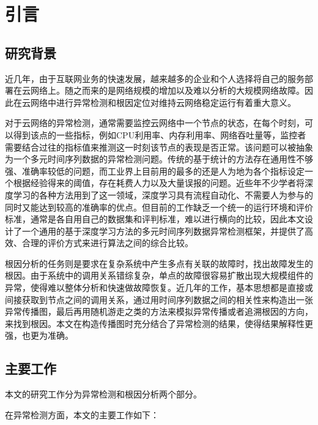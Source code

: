 
\chapter{引言}
\label{cha:intro}

\section{研究背景}
近几年，由于互联网业务的快速发展，越来越多的企业和个人选择将自己的服务部署在云网络上。随之而来的是网络规模的增加以及难以分析的大规模网络故障。因此在云网络中进行异常检测和根因定位对维持云网络稳定运行有着重大意义。

对于云网络的异常检测，通常需要监控云网络中一个节点的状态，在每个时刻，可以得到该点的一些指标，例如CPU利用率、内存利用率、网络吞吐量等，监控者需要结合过往的指标值来推测这一时刻该节点的表现是否正常。该问题可以被抽象为一个多元时间序列数据的异常检测问题。传统的基于统计的方法存在通用性不够强、准确率较低的问题，而工业界上目前用的最多的还是人为地为各个指标设定一个根据经验得来的阈值，存在耗费人力以及大量误报的问题。近些年不少学者\cite{an2015variational,malhotra2015long,malhotra2016lstm,nguyen2018anomaly,park2018multimodal,ruff2018deep,su2019robust,zong2018deep,xu2018unsupervised,siffer2017anomaly}将深度学习的各种方法用到了这一领域，深度学习具有流程自动化、不需要人为参与的同时又能达到较高的准确率的优点。但目前的工作缺乏一个统一的运行环境和评价标准，通常是各自用自己的数据集和评判标准，难以进行横向的比较，因此本文设计了一个通用的基于深度学习方法的多元时间序列数据异常检测框架，并提供了高效、合理的评价方式来进行算法之间的综合比较。

根因分析的任务则是要求在复杂系统中产生多点有关联的故障时，找出故障发生的根因。由于系统中的调用关系错综复杂，单点的故障很容易扩散出现大规模组件的异常，使得难以整体分析和快速做故障恢复。近几年的工作\cite{lin2016automated,weng2018root,wu2020microrca}，基本思想都是直接或间接获取到节点之间的调用关系，通过用时间序列数据之间的相关性来构造出一张异常传播图，最后再用随机游走之类的方法来模拟异常传播或者追溯根因的方向，来找到根因。本文在构造传播图时充分结合了异常检测的结果，使得结果解释性更强，也更为准确。


\section{主要工作}
本文的研究工作分为异常检测和根因分析两个部分。

在异常检测方面，本文的主要工作如下：

